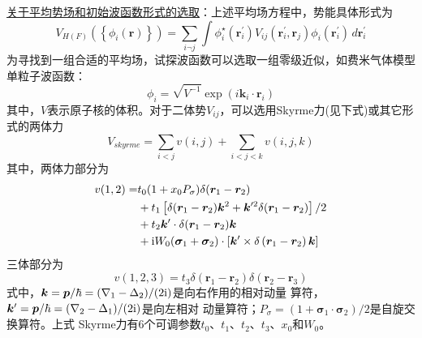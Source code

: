 \uline{关于平均势场和初始波函数形式的选取}：上述平均场方程中，势能具体形式为
\begin{equation}
    V_{H(F)}\left( \left\{ \phi_i(\bm{r}) \right\} \right) = \sum_{i \neg j} \int 
    \phi_i^{\star}(\bm{r}_i^{\prime}) V_{ij}(\bm{r}_i^{\prime}, \bm{r}_j) \phi_{i}(\bm{r}_i^{\prime})
    \,d\bm{r}_i^{\prime}
    \label{eq:mean-field}
\end{equation}
为寻找到一组合适的平均场，试探波函数可以选取一组零级近似，如费米气体模型单粒子波函数：
\begin{equation}
    \phi_i = \sqrt{V^{-1}} \exp{(i \bm{k}_i \cdot \bm{r}_i)}
    \label{eq:fermi-gas-eigen}
\end{equation}
其中，$V$表示原子核的体积。对于二体势$V_{ij}$，可以选用Skyrme力(见下式)或其它形式的两体力
\begin{equation}
    V_{skyrme} = \sum_{i<j} v(i, j) + \sum_{i<j<k} v(i, j, k)
    \label{eq:skyrme-forc}
\end{equation}
其中，两体力部分为
\begin{equation}
    \begin{aligned}
        v(1, 2) =& t_0 (1 + x_0 P_{\sigma})\delta(\bm{r}_1 - \bm{r}_2) \\
            & + t_1\left[ \delta(\bm{r}_1 - \bm{r}_2) \bm{k}^{2}
              + \bm{k}^{\prime 2}\delta(\bm{r}_1 - \bm{r}_2)\right] / 2 \\
            & + t_2\bm{k}^{\prime} \cdot \delta(\bm{r}_1 - \bm{r}_2) \bm{k} \\
            & + {\rm i} W_0(\bm{\sigma}_1 + \bm{\sigma}_2)\cdot \left[ 
            \bm{k}^{\prime} \times \delta\left( \bm{r}_1 - \bm{r}_2 \right) \bm{k}\right]
    \end{aligned}
    \label{eq:skyrme-tow-body-forc}
\end{equation}
三体部分为
\begin{equation}
    v(1, 2, 3) = t_3 \delta(\bm{r}_1 - \bm{r}_2) \delta(\bm{r}_2 - \bm{r}_3)
    \label{eq:skyrm-three-body-forc}
\end{equation}
式中，$\bm{k} = \bm{p}/\hbar = (\nabla_{1} - \Delta_{2}) / (2{\rm i})$是向右作用的相对动量
算符，$\bm{k}^{\prime} = \bm{p}/\hbar = (\nabla_{2} - \Delta_{1}) / (2{\rm i})$是向左相对
动量算符；$P_{\sigma} = (1 + \bm{\sigma}_1 \cdot \bm{\sigma}_2) / 2$是自旋交换算符。上式
Skyrme力有6个可调参数$t_0$、$t_1$、$t_2$、$t_3$、$x_0$和$W_0$。

